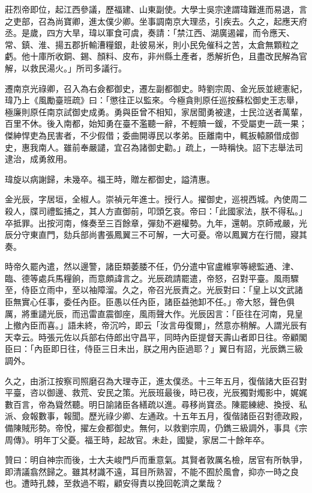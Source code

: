 \begin{pinyinscope}
莊烈帝即位，起江西參議，歷福建、山東副使。大學士吳宗達謂瑋難進而易退，言之吏部，召為尚寶卿，進太僕少卿。坐事調南京大理丞，引疾去。久之，起應天府丞。是歲，四方大旱，瑋以軍食可虞，奏請：「禁江西、湖廣遏糴，而令應天、常、鎮、淮、揚五郡折輸漕糧銀，赴彼易米，則小民免催科之苦，太倉無顆粒之虧。他十庫所收銅、錫、顏料、皮布，非州縣土產者，悉解折色，且盡改民解為官解，以救民湯火。」所司多議行。

遷南京光祿卿，召入為右僉都御史，遷左副都御史。時劉宗周、金光辰並總憲紀，瑋乃上《風勵臺班疏》曰：「懲往正以監來。今極貪則原任巡按蘇松御史王志舉，極廉則原任南京試御史成勇。勇與臣曾不相知，家居聞勇被逮，士民泣送者萬輩，百里不休。後入南都，始知勇在臺不濫聽一辭，不輕贖一鍰，不受屬吏一蔬一果；傑紳悍吏為民害者，不少假借；委曲開導民以孝弟。臣離南中，輒扳轅願借成御史，惠我南人。雖前奉嚴譴，宜召為諸御史勸。」疏上，一時稱快。詔下志舉法司逮治，成勇敘用。

瑋旋以病謝歸，未幾卒。福王時，贈左都御史，謚清惠。

金光辰，字居垣，全椒人。崇禎元年進士。授行人。擢御史，巡視西城。內使周二殺人，牒司禮監捕之，其人方直御前，叩頭乞哀。帝曰：「此國家法，朕不得私。」卒抵罪。出按河南，條奏至三百餘章，彈劾不避權勢。九年，還朝。京師戒嚴，光辰分守東直門，劾兵部尚書張鳳翼三不可解，一大可憂。帝以鳳翼方在行間，寢其奏。

時帝久罷內遣，然以邊警，諸臣類萎腇不任，仍分遣中官盧維寧等總監通、津、臨、德等處兵馬糧餉，而意頗諱言之。光辰疏請罷遣，帝怒，召對平臺。風雨驟至，侍臣立雨中，至以袖障溜。久之，帝召光辰責之。光辰對曰：「皇上以文武諸臣無實心任事，委任內臣。臣愚以任內臣，諸臣益弛卸不任。」帝大怒，聲色俱厲，將重譴光辰，而迅雷直震御座，風雨聲大作。光辰因言：「臣往在河南，見皇上撤內臣而喜。」語未終，帝沉吟，即云「汝言毋復爾」，然意亦稍解。人謂光辰有天幸云。時張元佐以兵部右侍郎出守昌平，同時內臣提督天壽山者即日往。帝顧閣臣曰：「內臣即日往，侍臣三日未出，朕之用內臣過耶？」翼日有詔，光辰鐫三級調外。

久之，由浙江按察司照磨召為大理寺正，進太僕丞。十三年五月，復偕諸大臣召對平臺，咨以御邊、救荒、安民之策。光辰班最後，時已夜，光辰獨對燭影中，娓娓數百言，帝為聳然聽。明日諭諸臣各繕疏以進。尋移尚寶丞。陳罷練總、換授、私派、僉報數事，報聞。歷光祿少卿、左通政。十五年五月，復偕諸臣召對德政殿，備陳賊形勢。帝悅，擢左僉都御史。無何，以救劉宗周，仍鐫三級調外，事具《宗周傳》。明年丁父憂。福王時，起故官。未赴，國變，家居二十餘年卒。

贊曰：明自神宗而後，士大夫峻門戶而重意氣。其賢者敦厲名檢，居官有所執爭，即清議翕然歸之。雖其材識不遠，耳目所熟習，不能不囿於風會，抑亦一時之良也。遭時孔棘，至救過不暇，顧安得責以挽回乾濟之業哉？


\end{pinyinscope}
